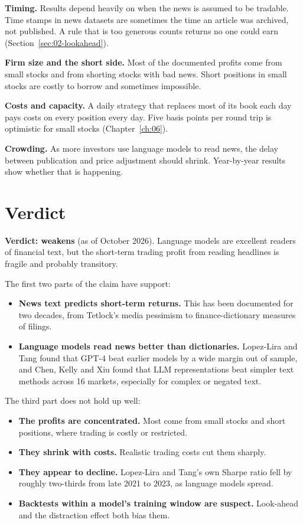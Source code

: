 \textbf{Timing.} Results depend heavily on when the news is assumed to be tradable. Time stamps in news datasets are sometimes the time an article was archived, not published. A rule that is too generous counts returns no one could earn (Section~\ref{sec:02-lookahead}).

\textbf{Firm size and the short side.} Most of the documented profits come from small stocks and from shorting stocks with bad news. Short positions in small stocks are costly to borrow and sometimes impossible.

\textbf{Costs and capacity.} A daily strategy that replaces most of its book each day pays costs on every position every day. Five basis points per round trip is optimistic for small stocks (Chapter~\ref{ch:06}).

\textbf{Crowding.} As more investors use language models to read news, the delay between publication and price adjustment should shrink. Year-by-year results show whether that is happening.

\section{Verdict}
\label{sec:23-verdict}

\begin{callout}
\textbf{Verdict: weakens} (as of October 2026). Language models are excellent readers of financial text, but the short-term trading profit from reading headlines is fragile and probably transitory.
\end{callout}

The first two parts of the claim have support:

\begin{itemize}
  \item \textbf{News text predicts short-term returns.} This has been documented for two decades, from Tetlock's media pessimism to finance-dictionary measures of filings.
  \item \textbf{Language models read news better than dictionaries.} Lopez-Lira and Tang found that GPT-4 beat earlier models by a wide margin out of sample, and Chen, Kelly and Xiu found that LLM representations beat simpler text methods across 16 markets, especially for complex or negated text.
\end{itemize}

The third part does not hold up well:

\begin{itemize}
  \item \textbf{The profits are concentrated.} Most come from small stocks and short positions, where trading is costly or restricted.
  \item \textbf{They shrink with costs.} Realistic trading costs cut them sharply.
  \item \textbf{They appear to decline.} Lopez-Lira and Tang's own Sharpe ratio fell by roughly two-thirds from late 2021 to 2023, as language models spread.
  \item \textbf{Backtests within a model's training window are suspect.} Look-ahead and the distraction effect both bias them.
\end{itemize}

